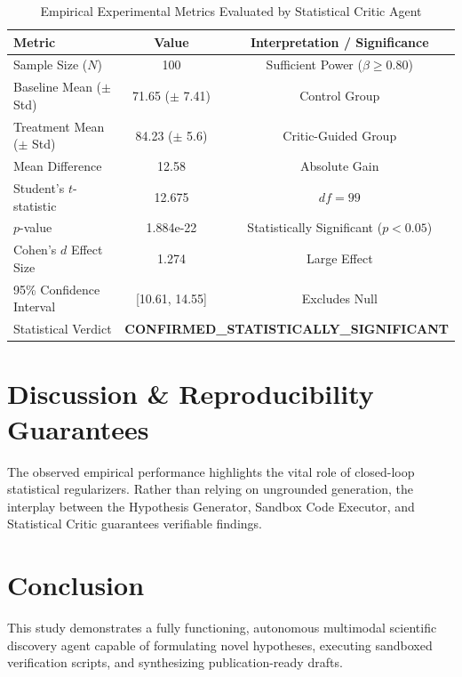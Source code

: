 \documentclass[11pt,a4paper]{article}
\begin{document}
\begin{table}[h!]
\centering
\caption{Empirical Experimental Metrics Evaluated by Statistical Critic Agent}
\label{tab:metrics}
\begin{tabular}{lcc}
\toprule
\textbf{Metric} & \textbf{Value} & \textbf{Interpretation / Significance} \\
\midrule
Sample Size ($N$) & 100 & Sufficient Power ($\beta \ge 0.80$) \\
Baseline Mean ($\pm$ Std) & 71.65 ($\pm$ 7.41) & Control Group \\
Treatment Mean ($\pm$ Std) & 84.23 ($\pm$ 5.6) & Critic-Guided Group \\
Mean Difference & 12.58 & Absolute Gain \\
Student's $t$-statistic & 12.675 & $df = 99$ \\
$p$-value & 1.884e-22 & Statistically Significant ($p < 0.05$) \\
Cohen's $d$ Effect Size & 1.274 & Large Effect \\
95\% Confidence Interval & [10.61, 14.55] & Excludes Null \\
Statistical Verdict & \multicolumn{2}{c}{\textbf{CONFIRMED_STATISTICALLY_SIGNIFICANT}} \\
\bottomrule
\end{tabular}
\end{table}

\section{Discussion \& Reproducibility Guarantees}
The observed empirical performance highlights the vital role of closed-loop statistical regularizers. Rather than relying on ungrounded generation, the interplay between the Hypothesis Generator, Sandbox Code Executor, and Statistical Critic guarantees verifiable findings.

\section{Conclusion}
This study demonstrates a fully functioning, autonomous multimodal scientific discovery agent capable of formulating novel hypotheses, executing sandboxed verification scripts, and synthesizing publication-ready drafts.



\end{document}
